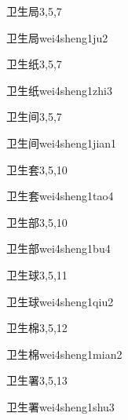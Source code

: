 \begin{entry}{卫生局}{3,5,7}
  \begin{phonetics}{卫生局}{wei4sheng1ju2}
  \end{phonetics}
\end{entry}

\begin{entry}{卫生纸}{3,5,7}
  \begin{phonetics}{卫生纸}{wei4sheng1zhi3}
  \end{phonetics}
\end{entry}

\begin{entry}{卫生间}{3,5,7}
  \begin{phonetics}{卫生间}{wei4sheng1jian1}
  \end{phonetics}
\end{entry}

\begin{entry}{卫生套}{3,5,10}
  \begin{phonetics}{卫生套}{wei4sheng1tao4}
  \end{phonetics}
\end{entry}

\begin{entry}{卫生部}{3,5,10}
  \begin{phonetics}{卫生部}{wei4sheng1bu4}
  \end{phonetics}
\end{entry}

\begin{entry}{卫生球}{3,5,11}
  \begin{phonetics}{卫生球}{wei4sheng1qiu2}
  \end{phonetics}
\end{entry}

\begin{entry}{卫生棉}{3,5,12}
  \begin{phonetics}{卫生棉}{wei4sheng1mian2}
  \end{phonetics}
\end{entry}

\begin{entry}{卫生署}{3,5,13}
  \begin{phonetics}{卫生署}{wei4sheng1shu3}
  \end{phonetics}
\end{entry}

